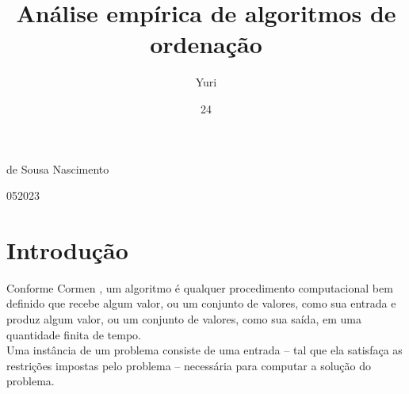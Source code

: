 \documentclass[report]{uftex}
\newcommand\uftex{UF\TeX}
\begin{document}
  \title{Análise empírica de algoritmos de ordenação}
  \author{Yuri}{de Sousa Nascimento}
  \date{24}{05}{2023}
  \foreignkeyword{\LaTeX}
  \foreignkeyword{\uftex}
  \maketitle

  \frontmatter
  
  \printlosymbols  
  \printloabbreviations
  \tableofcontents %
\mainmatter
\onehalfspacing
\chapter{Introdução}

Conforme Cormen \cite{cormen}, um algoritmo é qualquer procedimento computacional bem definido que recebe algum valor, ou um conjunto de valores, como sua entrada e produz algum valor, ou um conjunto de valores, como sua saída, em uma quantidade finita de tempo.\\

Uma instância de um problema consiste de uma entrada – tal que ela satisfaça as restrições impostas pelo problema – necessária para computar a solução do problema.\\
\end{document}
